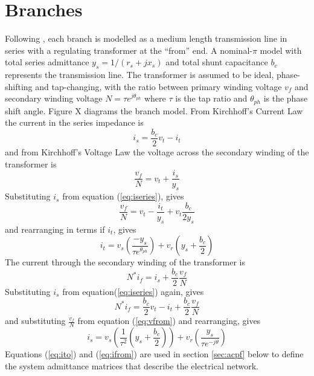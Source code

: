 \section{Branches}
Following \cite[p.11]{pserc:mp_manual}, each branch is modelled as a medium
length transmission line in series with a regulating transformer at the ``from'' end.  A nominal-$\pi$ model with total
series admittance $y_s = 1/(r_s+jx_s)$ and total shunt capacitance $b_c$
represents the transmission line.  The transformer is assumed to be ideal,
phase-shifting and tap-changing, with the ratio between primary winding
voltage $v_{f}$ and secondary winding voltage $N = \tau e^{j\theta_{ph}}$
where $\tau$ is the tap ratio and $\theta_{ph}$ is the phase shift angle.
Figure X diagrams the branch model.  From Kirchhoff's Current Law the current
in the series impedance is
\begin{equation}
\label{eq:iseries}
i_s = \frac{b_c}{2}v_t - i_t
\end{equation}
and from Kirchhoff's Voltage Law the voltage across the secondary winding of
the transformer is
\begin{equation}
\frac{v_{f}}{N} = v_t + \frac{i_s}{y_s}
\end{equation}
Substituting $i_s$ from equation (\ref{eq:iseries}), gives
\begin{equation}
\label{eq:vfrom}
\frac{v_{f}}{N} = v_t - \frac{i_t}{y_s} + v_t\frac{b_c}{2y_s}
\end{equation}
and rearranging in terms if $i_t$, gives
\begin{equation}
\label{eq:ito}
i_t = v_s \left( \frac{-y_s}{\tau e^{\theta_{ph}}} \right) +
v_r \left( y_s + \frac{b_c}{2} \right)
\end{equation}
The current through the secondary winding of the transformer is
\begin{equation}
N^*i_f = i_s + \frac{b_c}{2}\frac{v_{f}}{N}
\end{equation}
Substituting $i_s$ from equation(\ref{eq:iseries}) again, gives
\begin{equation}
N^*i_f = \frac{b_c}{2}v_t - i_t + \frac{b_c}{2}\frac{v_{f}}{N}
\end{equation}
and substituting $\frac{v_{f}}{N}$ from equation (\ref{eq:vfrom}) and
rearranging, gives
\begin{equation}
\label{eq:ifrom}
i_s = v_s \left( \frac{1}{\tau^2} \left(y_s + \frac{b_c}{2}\right) \right) +
v_r \left(\frac{y_s}{\tau e^{-j\theta}}\right)
\end{equation}
Equations (\ref{eq:ito}) and (\ref{eq:ifrom}) are used in section
\ref{sec:acpf} below to define the system admittance matrices that describe
the electrical network.

